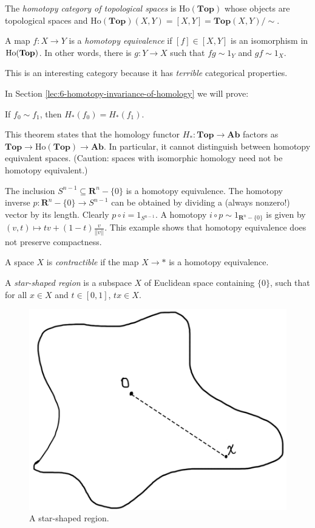 \begin{definition}
The \emph{homotopy category of topological spaces} is $\mathrm{Ho}(\mathbf{Top})$ whose objects are topological spaces and $\mathrm{Ho}(\mathbf{Top})(X,Y)=[X,Y]=\mathbf{Top}(X,Y)/\sim$.
\end{definition}
\begin{definition}
	A map $f:X\to Y$ is a \emph{homotopy equivalence} if $[f]\in[X,Y]$ is an isomorphism in $\mathrm{Ho}(\mathbf{Top})$. In other words, there is $g:Y\to X$ such that $fg\sim 1_Y$ and $gf\sim 1_X$.
\end{definition}
This is an interesting category because it has \textit{terrible} categorical properties.

In Section \ref{lec:6-homotopy-invariance-of-homology} we will prove:
\begin{theorem}
	If $f_0\sim f_1$, then $ H_\ast(f_0)= H_\ast(f_1)$.
\end{theorem}
This theorem states that the homology functor $H_\ast:\mathbf{Top}\to\mathbf{Ab}$ factors as $\mathbf{Top}\to\mathrm{Ho}(\mathbf{Top})\to\mathbf{Ab}$. In particular, it cannot distinguish between homotopy equivalent spaces. (Caution: spaces with isomorphic homology need not be homotopy equivalent.)
\begin{example}\label{exa:homotopy-equivalence-sphere}
The inclusion $S^{n-1}\subseteq \mathbf{R}^n-\{0\}$ is a homotopy equivalence. The homotopy inverse $p:\mathbf{R}^n-\{0\}\to S^{n-1}$ can be obtained by dividing a (always nonzero!) vector by its length. Clearly $p\circ i=1_{S^{n-1}}$. A homotopy $i\circ p\sim 1_{\mathbf{R}^n-\{0\}}$ is given by $(v,t)\mapsto tv+(1-t)\frac{v}{||v||}$. This example shows that homotopy equivalence does not preserve compactness.
\end{example}
\begin{definition}
A space $X$ is \emph{contractible} if the map $X\to\ast$ is a homotopy equivalence.
\end{definition}

\begin{definition}
	A \emph{star-shaped region} is a subspace $X$ of Euclidean space containing $\{0\}$, such that for all $x\in X$ and $t\in[0,1]$, $tx\in X$. 
\end{definition}
\begin{figure}
	\centering
	\includegraphics[width=0.4\linewidth]{assets/L05/05-star-shaped-region}
	\caption{A star-shaped region.}
	\label{fig:05-star-shaped-region}
\end{figure}

